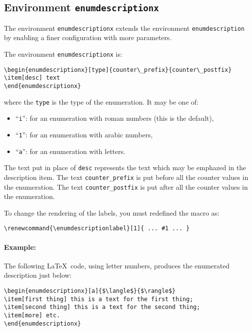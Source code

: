 \documentclass[book]{upmethodology-document}
\begin{document}
\subsection{Environment \texttt{enumdescriptionx}}

The environment \texttt{enumdescriptionx} extends the environment \texttt{enumdescription} by enabling a finer configuration with more parameters.


The environment \texttt{enumdescriptionx} is:
\begin{verbatim}
\begin{enumdescriptionx}[type]{counter\_prefix}{counter\_postfix}
\item[desc] text
\end{enumdescriptionx}
\end{verbatim}
where the \texttt{type} is the type of the enumeration. It may be one of:
\begin{itemize}
\item ``\texttt{i}'': for an enumeration with roman numbers (this is the default),
\item ``\texttt{1}'': for an enumeration with arabic numbers,
\item ``\texttt{a}'': for an enumeration with letters.
\end{itemize}
The text put in place of \texttt{desc} represents the text which may be emphazed in the description item.
The text \texttt{counter\_prefix} is put before all the counter values in the enumeration.
The text \texttt{counter\_postfix} is put after all the counter values in the enumeration.


To change the rendering of the labels, you must redefined the macro as:
\begin{verbatim}
\renewcommand{\enumdescriptionlabel}[1]{ ... #1 ... }
\end{verbatim}


\paragraph{Example:} The following \LaTeX~code, using letter numbers, produces the enumerated description just below:
\begin{verbatim}
\begin{enumdescriptionx}[a]{$\langle$}{$\rangle$}
\item[first thing] this is a text for the first thing;
\item[second thing] this is a text for the second thing;
\item[more] etc.
\end{enumdescriptionx}
\end{verbatim}
\end{document}
